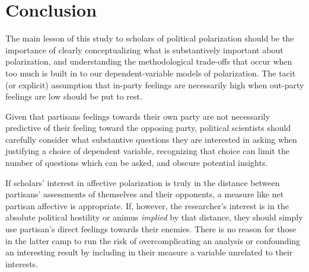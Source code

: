 \documentclass[12pt]{article}
\begin{document}
\section{Conclusion}
The main lesson of this study to scholars of political polarization should be the importance of clearly conceptualizing what is substantively important about polarization, and understanding the methodological trade-offs that occur when too much is built in to our dependent-variable models of polarization. The tacit (or explicit) assumption that in-party feelings are necessarily high when out-party feelings are low should be put to rest.

Given that partisans feelings towards their own party are not necessarily predictive of their feeling toward the opposing party, political scientists should carefully consider what substantive questions they are interested in asking when justifying a choice of dependent variable, recognizing that choice can limit the number of questions which can be asked, and obscure potential insights.

If scholars' interest in affective polarization is truly in the distance between partisans' assessments of themselves and their opponents, a measure like net partisan affective is appropriate. If, however, the researcher's interest is in the absolute political hostility or animus \textit{implied} by that distance, they should simply use partisan's direct feelings towards their enemies. There is no reason for those in the latter camp to run the risk of overcomplicating an analysis or confounding an interesting result by including in their measure a variable unrelated to their interests.






\thispagestyle{empty}
\clearpage
{}

\end{document}
